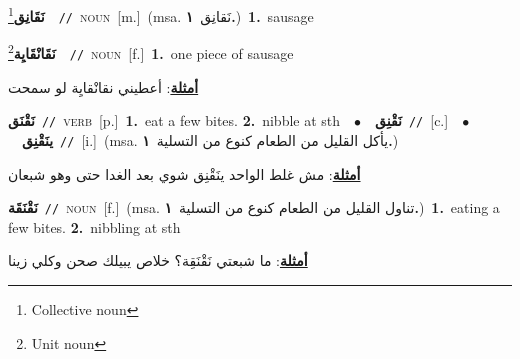 \documentclass[10pt,a4paper,twoside]{article} %
\begin{document}
\begin{multicols}{2}
{\setlength\topsep{0pt}\textbf{\foreignlanguage{arabic}{نَقَانِق}}\footnote{Collective noun}\ \ {\color{gray}\texttt{//}\color{black}}\ \textsc{noun}\ [m.]\ \color{gray}(msa. \foreignlanguage{arabic}{نَقانِق}~\foreignlanguage{arabic}{\textbf{١.}})\color{black}\ \textbf{1.}~sausage\ } \vspace{2mm}

{\setlength\topsep{0pt}\textbf{\foreignlanguage{arabic}{نَقَانْقَايِة}}\footnote{Unit noun}\ \ {\color{gray}\texttt{//}\color{black}}\ \textsc{noun}\ [f.]\ \textbf{1.}~one piece of sausage\  \begin{flushright}\color{gray}\foreignlanguage{arabic}{\textbf{\underline{\foreignlanguage{arabic}{أمثلة}}}: أعطيني نقانْقايِة لو سمحت}\end{flushright}\color{black}} \vspace{2mm}

{\setlength\topsep{0pt}\textbf{\foreignlanguage{arabic}{نَقْنَق}}\ {\color{gray}\texttt{//}\color{black}}\ \textsc{verb}\ [p.]\ \textbf{1.}~eat a few bites.  \textbf{2.}~nibble at sth\ \ $\bullet$\ \ \setlength\topsep{0pt}\textbf{\foreignlanguage{arabic}{نَقْنِق}}\ {\color{gray}\texttt{//}\color{black}}\ [c.]\ \ $\bullet$\ \ \setlength\topsep{0pt}\textbf{\foreignlanguage{arabic}{ينَقْنِق}}\ {\color{gray}\texttt{//}\color{black}}\ [i.]\ \color{gray}(msa. \foreignlanguage{arabic}{يأكل القليل من الطعام كنوع من التسلية}~\foreignlanguage{arabic}{\textbf{١.}})\color{black}\  \begin{flushright}\color{gray}\foreignlanguage{arabic}{\textbf{\underline{\foreignlanguage{arabic}{أمثلة}}}: مش غلط الواحد ينَقْنِق شوي بعد الغدا حتى وهو شبعان}\end{flushright}\color{black}} \vspace{2mm}

{\setlength\topsep{0pt}\textbf{\foreignlanguage{arabic}{نَقْنَقَة}}\ {\color{gray}\texttt{//}\color{black}}\ \textsc{noun}\ [f.]\ \color{gray}(msa. \foreignlanguage{arabic}{تناول القليل من الطعام كنوع من التسلية}~\foreignlanguage{arabic}{\textbf{١.}})\color{black}\ \textbf{1.}~eating a few bites.  \textbf{2.}~nibbling at sth\  \begin{flushright}\color{gray}\foreignlanguage{arabic}{\textbf{\underline{\foreignlanguage{arabic}{أمثلة}}}: ما شبعتي نَقْنَقِة؟ خلاص يبيلك صحن وكلي زينا}\end{flushright}\color{black}} \vspace{2mm}


\end{multicols}
\end{document}
